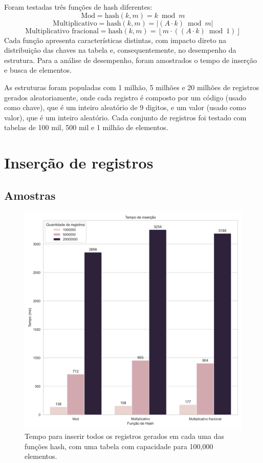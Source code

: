 \documentclass[12pt]{article}
\begin{document}
Foram testadas três funções de hash diferentes: 
$$\text{Mod} = \text{hash}(k, m) = k \bmod m$$
$$\text{Multiplicativo} = \text{hash}(k, m) = \left| (A \cdot k) \bmod m \right|$$
$$\text{Multiplicativo fracional} = \text{hash}(k, m) = \left\lfloor m \cdot ((A \cdot k) \bmod 1) \right\rfloor$$
Cada função apresenta características distintas, com impacto direto na distribuição das chaves na tabela e, consequentemente, no desempenho da estrutura.
Para a análise de desempenho, foram amostrados o tempo de inserção e busca de elementos.

As estruturas foram populadas com 1 milhão, 5 milhões e 20 milhões de registros gerados aleatoriamente, 
onde cada registro é composto por um código (usado como chave), que é um inteiro aleatório de 9 digitos, e um valor (usado como valor), que é um inteiro aleatório.
Cada conjunto de registros foi testado com tabelas de 100 mil, 500 mil e 1 milhão de elementos.

\section{Inserção de registros}

\subsection{Amostras}

\begin{figure}[ht]
\centering
\includegraphics[width=\textwidth,height=\textheight,keepaspectratio]{figures/InsertionRuntime_100000.png}
\caption{Tempo para inserir todos os registros gerados em cada uma das funções hash, com uma tabela com capacidade para 100,000 elementos.}
\end{figure}
\end{document}
